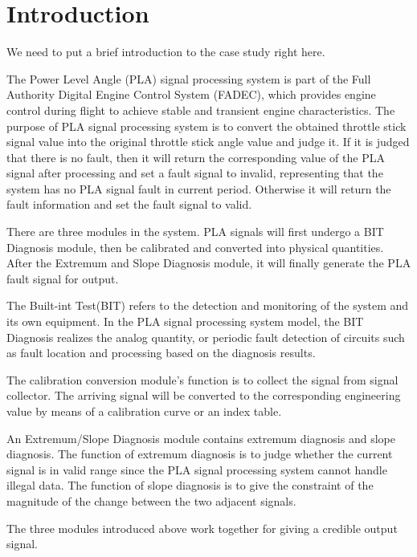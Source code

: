 
\section{Introduction}
\label{introduction}


\textcolor[rgb]{1.00,0.00,0.00}{We need to put a brief introduction to the case study right here.}

The Power Level Angle (PLA) signal processing system is part of the Full Authority Digital Engine Control System (FADEC), 
 which provides engine control during flight to achieve stable and transient engine characteristics. 
 The purpose of PLA signal processing system is to convert the obtained throttle stick signal value into the original throttle stick angle value and judge it. 
 If it is judged that there is no fault, then it will return the corresponding value of the PLA signal after processing and set a fault signal to invalid, 
 representing that the system has no PLA signal fault in current period. 
 Otherwise it will return the fault information and set the fault signal to valid.

There are three modules in the system. PLA signals will first undergo a BIT Diagnosis module, 
 then be calibrated and converted into physical quantities. 
 After the Extremum and Slope Diagnosis module, it will finally generate the PLA fault signal for output.

The Built-int Test(BIT) refers to the detection and monitoring of the system and its own equipment. 
 In the PLA signal processing system model, the BIT Diagnosis realizes the analog quantity, 
 or periodic fault detection of circuits such as fault location and processing based on the diagnosis results.

The calibration conversion module's function is to collect the signal from signal collector. 
 The arriving signal will be converted to the corresponding engineering value by means of a calibration curve or an index table.

An Extremum/Slope Diagnosis module contains extremum diagnosis and slope diagnosis.
 The function of extremum diagnosis is to judge whether the current signal is in valid range since the PLA signal processing system cannot handle illegal data. 
 The function of slope diagnosis is to give the constraint of the magnitude of the change between the two adjacent signals.

The three modules introduced above work together for giving a credible output signal. 


